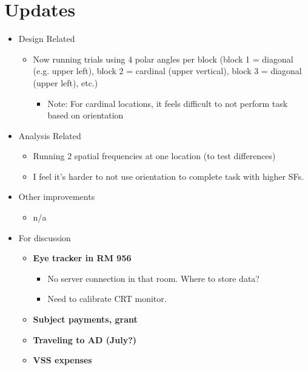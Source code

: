\documentclass[11pt]{article} %
\begin{document}
\section{Updates} 
\begin{itemize}
\item Design Related
	\begin{itemize}
	\item Now running trials using 4 polar angles per block (block 1 = diagonal (e.g. upper left), block 2 = cardinal (upper vertical), block 3 = diagonal (upper left), etc.)
		\begin{itemize}
			\item{Note: For cardinal locations, it feels difficult to not perform task based on orientation}
		\end{itemize}
	\end{itemize}
\item Analysis Related
	\begin{itemize}
	\item Running 2 spatial frequencies at one location (to test differences)
	\item I feel it's harder to not use orientation to complete task with higher SFs.
	\end{itemize}
\item Other improvements
	\begin{itemize}
	\item n/a
	\end{itemize}
\item For discussion
	\begin{itemize}
	\item \textbf{Eye tracker in RM 956}
		\begin{itemize}
			\item{No server connection in that room. Where to store data?}
			\item{Need to calibrate CRT monitor.}
		\end{itemize}
	\item \textbf{Subject payments, grant}
	\item \textbf{Traveling to AD (July?)}
	\item \textbf{VSS expenses}
	\end{itemize}
\end{itemize}
\end{document}

